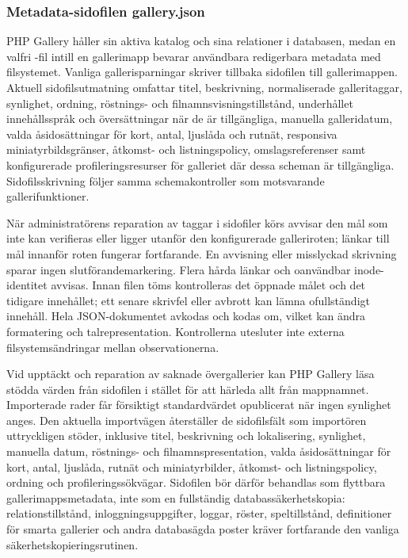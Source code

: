 \documentclass[11pt,a4paper]{article}
\newcommand{\filepath}[1]{\path{#1}}
\begin{document}
\subsubsection{Metadata-sidofilen gallery.json}

PHP Gallery håller sin aktiva katalog och sina relationer i databasen, medan en
valfri \filepath{gallery.json}-fil intill en gallerimapp bevarar användbara
redigerbara metadata med filsystemet. Vanliga gallerisparningar skriver tillbaka
sidofilen till gallerimappen. Aktuell sidofilsutmatning omfattar titel,
beskrivning, normaliserade galleritaggar, synlighet, ordning, röstnings- och
filnamnsvisningstillstånd, underhållet innehållsspråk och översättningar när de
är tillgängliga, manuella galleridatum, valda åsidosättningar för kort, antal,
ljuslåda och rutnät, responsiva miniatyrbildsgränser, åtkomst- och
listningspolicy, omslagsreferenser samt konfigurerade profileringsresurser för
galleriet där dessa scheman är tillgängliga. Sidofilsskrivning följer samma
schemakontroller som motsvarande gallerifunktioner.

När administratörens reparation av taggar i sidofiler körs avvisar den mål som
inte kan verifieras eller ligger utanför den konfigurerade galleriroten; länkar
till mål innanför roten fungerar fortfarande. En avvisning eller misslyckad
skrivning sparar ingen slutförandemarkering. Flera hårda länkar och oanvändbar
inode-identitet avvisas. Innan filen töms kontrolleras det öppnade målet och
det tidigare innehållet; ett senare skrivfel eller avbrott kan lämna
ofullständigt innehåll. Hela JSON-dokumentet avkodas och kodas om, vilket kan
ändra formatering och talrepresentation. Kontrollerna utesluter inte externa
filsystemsändringar mellan observationerna.

Vid upptäckt och reparation av saknade övergallerier kan PHP Gallery läsa stödda
värden från sidofilen i stället för att härleda allt från mappnamnet.
Importerade rader får försiktigt standardvärdet opublicerat när ingen synlighet
anges. Den aktuella importvägen återställer de sidofilsfält som importören
uttryckligen stöder, inklusive titel, beskrivning och lokalisering, synlighet,
manuella datum, röstnings- och filnamnspresentation, valda åsidosättningar för
kort, antal, ljuslåda, rutnät och miniatyrbilder, åtkomst- och listningspolicy,
ordning och profileringssökvägar. Sidofilen bör därför behandlas som flyttbara
gallerimappsmetadata, inte som en fullständig databassäkerhetskopia:
relationstillstånd, inloggningsuppgifter, loggar, röster, speltillstånd,
definitioner för smarta gallerier och andra databasägda poster kräver
fortfarande den vanliga säkerhetskopieringsrutinen.
\end{document}
